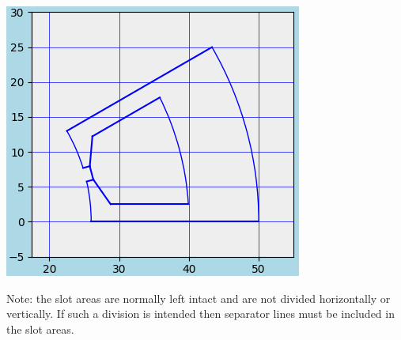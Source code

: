 \documentclass[10pt, a4paper,german]{scrartcl}
\begin{document}
\begin{center}
\includegraphics[width=0.45\linewidth]{BspWindings}
\end{center}
Note: the slot areas are normally left intact and are not divided horizontally or vertically.
If such a division is intended then separator lines must be included in the slot areas.
\end{document}
